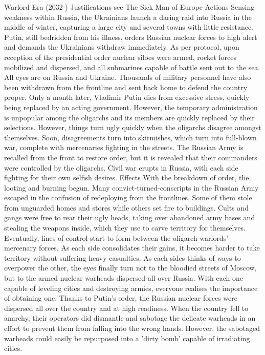     Warlord Era (2032-)
        Justifications
            see The Sick Man of Europe
        Actions
            Sensing weakness within Russia, the Ukrainians launch a daring raid into Russia in the middle of winter, capturing a large city and several towns with little resistance. Putin, still bedridden from his illness, orders Russian nuclear forces to high alert and demands the Ukrainians withdraw immediately.
            As per protocol, upon reception of the presidential order nuclear siloes were armed, rocket forces mobilized and dispersed, and all submarines capable of battle sent out to the sea. All eyes are on Russia and Ukraine. Thousands of military personnel have also been withdrawn from the frontline and sent back home to defend the country proper.
            Only a month later, Vladimir Putin dies from excessive stress, quickly being replaced by an acting government. However, the temporary administration is unpopular among the oligarchs and its members are quickly replaced by their selections. However, things turn ugly quickly when the oligarchs disagree amongst themselves.
            Soon, disagreements turn into skirmishes, which turn into full-blown war, complete with mercenaries fighting in the streets. The Russian Army is recalled from the front to restore order, but it is revealed that their commanders were controlled by the oligarchs. Civil war erupts in Russia, with each side fighting for their own selfish desires.
        Effects
            With the breakdown of order, the looting and burning begun. Many convict-turned-conscripts in the Russian Army escaped in the confusion of redeploying from the frontlines. Some of them stole from unguarded homes and stores while others set fire to buildings. Cults and gangs were free to rear their ugly heads, taking over abandoned army bases and stealing the weapons inside, which they use to carve territory for themselves. 
            Eventually, lines of control start to form between the oligarch-warlords' mercenary forces. As each side consolidates their gains, it becomes harder to take territory without suffering heavy casualties. As each sides thinks of ways to overpower the other, the eyes finally turn not to the bloodied streets of Moscow, but to the armed nuclear warheads dispersed all over Russia. With each one capable of leveling cities and destroying armies, everyone realises the importance of obtaining one.
            Thanks to Putin's order, the Russian nuclear forces were dispersed all over the country and at high readiness. When the country fell to anarchy, their operators did dismantle and sabotage the delicate warheads in an effort to prevent them from falling into the wrong hands. However, the sabotaged warheads could easily be repurposed into a 'dirty bomb' capable of irradiating cities. 
    
